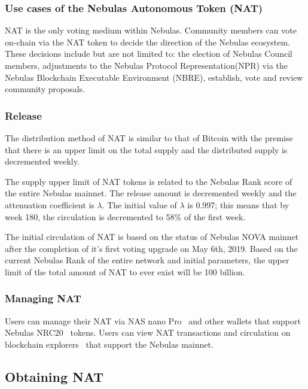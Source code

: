 \subsubsection{Use cases of the Nebulas Autonomous Token (NAT)}


NAT is the only voting medium within Nebulas. Community members can vote on-chain via the NAT token to decide the direction of the Nebulas ecosystem. These decisions include but are not limited to: the election of Nebulas Council members, adjustments to the Nebulas Protocol Representation(NPR) via the Nebulas Blockchain Executable Environment (NBRE), establish, vote and review community proposals.

\subsubsection{Release}

The distribution method of NAT is similar to that of Bitcoin with the premise that there is an upper limit on the total supply and the distributed supply is decremented weekly.

The supply upper limit of NAT tokens is related to the Nebulas Rank score of
the entire Nebulas mainnet. The release amount is decremented weekly and the
attenuation coefficient is $\lambda$. The initial value of $\lambda$ is 0.997; this means that by week 180, the circulation is decremented to 58\% of the first week.

The initial circulation of NAT is based on the status of Nebulas NOVA mainnet after the completion of it's first voting upgrade on May 6th, 2019. Based on the current Nebulas Rank of the entire network and initial parameters, the upper limit of the total amount of NAT to ever exist will be 100 billion.

\subsubsection{Managing NAT}

Users can manage their NAT via NAS nano Pro~\cite{NASnano} and other wallets that support Nebulas NRC20~\cite{wallets} tokens. Users can view NAT transactions and circulation on blockchain explorers~\cite{explorer} that support the Nebulas mainnet.

\subsection{Obtaining NAT}

